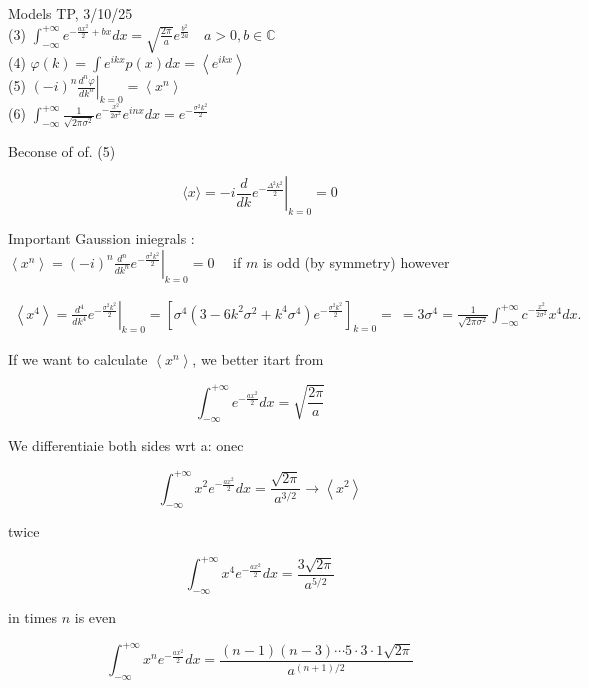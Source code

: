 Models TP, 3/10/25\\
(3) \quad $\int_{-\infty}^{+\infty} e^{-\frac{a x^{2}}{2}+b x} d x=\sqrt{\frac{2 \pi}{a}} e^{\frac{b^{2}}{2 a}} \quad a>0, b \in \mathbb{C}$\\
(4) $\varphi(k)=\int e^{i k x} p(x) d x=\left\langle e^{i k x}\right\rangle$\\
(5) $\left.(-i)^{n} \frac{d^{n} \varphi}{d k^{n}}\right|_{k=0}=\left\langle x^{n}\right\rangle$\\
(6) \quad $\int_{-\infty}^{+\infty} \frac{1}{\sqrt{2 \pi \sigma^{2}}} e^{-\frac{x^{2}}{2 \sigma^{2}}} e^{i n x} d x=e^{-\frac{\sigma^{2} k^{2}}{2}}$

Beconse of of. (5)

$$ 
\langle x\rangle=-\left.i \frac{d}{d k} e^{-\frac{\Delta^{2} k^{2}}{2}}\right|_{k=0}=0 
$$ 

Important Gaussion iniegrals :\\
$\left\langle x^{n}\right\rangle=\left.(-i)^{n} \frac{d^{n}}{d k^{n}} e^{-\frac{\sigma^{2} k^{2}}{2}}\right|_{k=0}=0 \quad$ if $m$ is odd (by symmetry)
\else however

$$ 
\begin{gathered}
\left\langle x^{4}\right\rangle=\left.\frac{d^{4}}{d k^{4}} e^{-\frac{\sigma^{2} k^{2}}{2}}\right|_{k=0}=\left[\sigma^{4}\left(3-6 k^{2} \sigma^{2}+k^{4} \sigma^{4}\right) e^{-\frac{\sigma^{2} k^{2}}{2}}\right]_{k=0}=\
=3 \sigma^{4}=\frac{1}{\sqrt{2 \pi \sigma^{2}}} \int_{-\infty}^{+\infty} c^{-\frac{x^{2}}{2 \sigma^{2}}} x^{4} d x .
\end{gathered}
$$ 

If we want to calculate $\left\langle x^{n}\right\rangle$, we better itart from

$$ 
\int_{-\infty}^{+\infty} e^{-\frac{a x^{2}}{2}} d x=\sqrt{\frac{2 \pi}{a}} 
$$ 

We differentiaie both sides wrt a:
onec

$$ 
\int_{-\infty}^{+\infty} x^{2} e^{-\frac{a x^{2}}{2}} d x=\frac{\sqrt{2 \pi}}{a^{3 / 2}} \rightarrow\left\langle x^{2}\right\rangle 
$$ 

twice

$$ 
\int_{-\infty}^{+\infty} x^{4} e^{-\frac{a x^{2}}{2}} d x=\frac{3 \sqrt{2 \pi}}{a^{5 / 2}} 
$$ 

in times $n$ is even

$$ 
\int_{-\infty}^{+\infty} x^{n} e^{-\frac{a x^{2}}{2}} d x=\frac{(n-1)(n-3) \cdots 5 \cdot 3 \cdot 1 \sqrt{2 \pi}}{a^{(n+1) / 2}} 
$$ 

